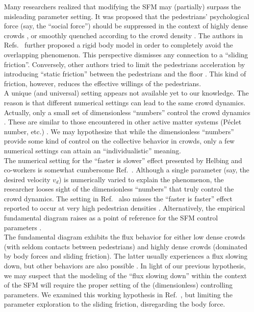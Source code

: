 \documentclass[preprint,12pt]{elsarticle}
\begin{document}
Many researchers realized that modifying the SFM may (partially) surpass the 
misleading parameter setting. It was proposed that the pedestrians' 
psychological force (say, the ``social force'') should be suppressed in the 
context of highly dense crowds 
\cite{pelechano_2007,moussaid_2011,alonso_2014,bottinelli_2017}, or smoothly 
quenched according to the crowd density \cite{song_2019}. The authors in 
Refs.~\cite{kabalan_2017,jebrane_2019} further proposed a rigid body model in 
order to completely avoid the overlapping phenomenon. This perspective 
dismisses 
any connection to a ``sliding friction''. Conversely, other authors tried to 
limit the pedestrians acceleration by introducing ``static friction'' between 
the pedestrians and the floor \cite{wang_2019}. This kind of friction, however, 
reduces the effective willings of the pedestrians.  \\  

A unique (and universal) setting appears not available yet to
our knowledge. 
 The reason is that different numerical settings can lead to 
the same crowd dynamics. Actually, only a small set of dimensionless 
``numbers'' control the crowd dynamics \cite{dorso_2019}. These are similar to 
those encountered in other active matter systems (P\'eclet number, etc.)  
\cite{marchetti_2014}. We may hypothesize that while the dimensionless 
``numbers'' provide some kind of control on the 
collective behavior in 
crowds, only a few numerical settings can attain an ``individualistic'' 
meaning. 
 \\

The numerical setting for the ``faster is slower'' effect presented by 
Helbing and co-workers is somewhat cumbersome 
Ref.~\cite{helbing_2000,dorso_2017,dorso_2019}. Although a single 
parameter (say, the desired velocity $v_d$) is numerically varied to 
explain the phenomenon, the researcher looses sight of the dimensionless 
``numbers'' that truly control the crowd dynamics. The setting in 
Ref.~\cite{helbing_2000} also misses the ``faster is faster'' effect reported 
to occur at very high pedestrian densities \cite{dorso_2017,haghani_2019}. 
Alternatively, the empirical fundamental diagram raises as a point of reference 
for the SFM control parameters \cite{helbing_2007,dorso_2017}. \\

The fundamental diagram exhibits the flux behavior for either low dense crowds 
(with seldom contacts between pedestrians) and highly dense crowds (dominated 
by 
body forces and sliding friction). The latter usually experiences a flux 
slowing 
down, but other behaviors are also possible \cite{helbing_2007,lohner_2018}. In 
light of our previous hypothesis, we may suspect that the  modeling of the 
``flux slowing down'' within the context of the SFM will require the proper 
setting of the (dimensionless) controlling parameters. We examined this working 
hypothesis in Ref.~\cite{dorso_2019}, but limiting the parameter exploration to 
the sliding friction, disregarding the body force. \\
\end{document}
